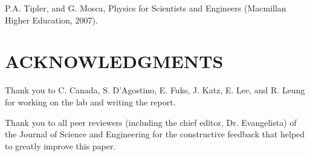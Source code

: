\documentclass[twocolumn, 10pt]{article}
\begin{document}
\noindent[2] P.A. Tipler, and G. Mosca, Physics for Scientists and Engineers (Macmillan Higher Education, 2007).



\section*{ACKNOWLEDGMENTS} 
Thank you to C. Canada, S. D’Agostino, E. Fuks, J. Katz, E. Lee, and R. Leung for working on the lab and writing the report.

Thank you to all peer reviewers (including the chief editor, Dr. Evangelista) of the Journal of Science and Engineering for the constructive feedback that helped to greatly improve this paper.
\end{document}
